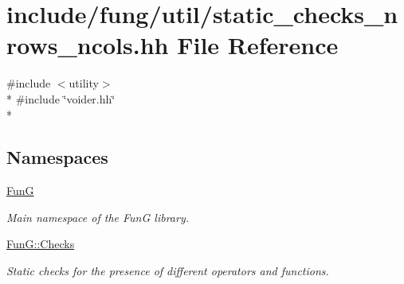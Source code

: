 \hypertarget{static__checks__nrows__ncols_8hh}{\section{include/fung/util/static\-\_\-checks\-\_\-nrows\-\_\-ncols.hh File Reference}
\label{static__checks__nrows__ncols_8hh}
}
{\ttfamily \#include $<$utility$>$}\\*
{\ttfamily \#include \char`\"{}voider.\-hh\char`\"{}}\\*
\subsection*{Namespaces}
\begin{DoxyCompactItemize}
\item 
\hyperlink{namespaceFunG}{Fun\-G}
\begin{DoxyCompactList}\small\item\em Main namespace of the Fun\-G library. \end{DoxyCompactList}\item 
\hyperlink{namespaceFunG_1_1Checks}{Fun\-G\-::\-Checks}
\begin{DoxyCompactList}\small\item\em Static checks for the presence of different operators and functions. \end{DoxyCompactList}\end{DoxyCompactItemize}
